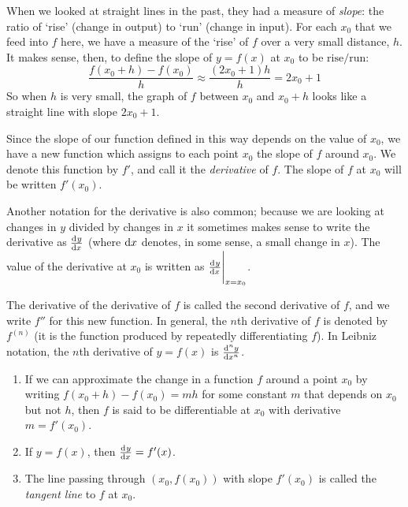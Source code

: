 When we looked at straight lines in the past, they had a measure of \emph{slope}: the ratio of `rise' (change in output) to `run'
(change in input). For each $ x_0 $ that we feed into $ f $ here, we have a measure of the `rise' of $ f $ over a very small distance, $ h $.
It makes sense, then, to define the slope of $ y = f(x) $ at $ x_0 $ to be $\text{rise}/\text{run}$:
\begin{equation}
  \frac{f(x_0 + h) - f(x_0)}{h} \approx \frac{(2x_0 + 1)h}{h} = 2x_0 + 1
\end{equation}
So when $ h $ is very small, the graph of $ f $ between $ x_0 $ and $ x_0 + h $ looks like a straight line with slope $ 2x_0 + 1 $.

Since the slope of our function defined in this way depends on the value of $ x_0 $, we have a new function which assigns to each point $ x_0 $
the slope of $ f $ around $ x_0 $. We denote this function by $ f' $, and call it the \emph{derivative} of $ f $. The slope of $ f $ at $ x_0 $
will be written $ f'(x_0) $.

Another notation for the derivative is also common; because we are looking at changes in $ y $ divided by changes in $ x $ it sometimes
makes sense to write the derivative as $ \od{y}{x} $ (where $ \dif{x} $ denotes, in some sense, a small change in $ x $). The value of the
derivative at $ x_0 $ is written as $ \eval{\od{y}{x}}_{x = x_0} $.

The derivative of the derivative of $ f $ is called the second derivative of $ f $, and we write $ f'' $ for this new function. In general,
the $ n$th derivative of $ f $ is denoted by $ f^{(n)} $ (it is the function produced by repeatedly differentiating $ f $). In Leibniz
notation, the $ n$th derivative of $ y = f(x) $ is $ \od[n]{y}{x} $.

\begin{defn}
  \begin{enumerate}
    \item If we can approximate the change in a function $ f $ around a point $ x_0 $ by writing $ f(x_0 + h) - f(x_0) = m h $
          for some constant $ m $ that depends on $ x_0 $ but not $ h $, then $ f $ is said to be differentiable at $ x_0 $
          with derivative $ m = f'(x_0) $.
    \item If $ y = f(x) $, then $ \od{y}{x} = f'(x) $.\
    \item The line passing through $ (x_0,f(x_0)) $ with slope $ f'(x_0) $ is called the \emph{tangent line} to $ f $ at $ x_0 $.
  \end{enumerate}
\end{defn}

